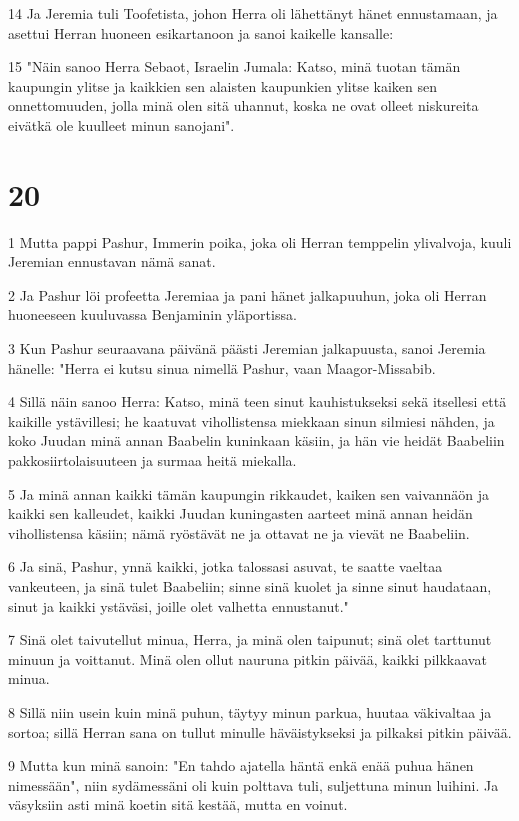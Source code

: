 \par 14 Ja Jeremia tuli Toofetista, johon Herra oli lähettänyt hänet ennustamaan, ja asettui Herran huoneen esikartanoon ja sanoi kaikelle kansalle:
\par 15 "Näin sanoo Herra Sebaot, Israelin Jumala: Katso, minä tuotan tämän kaupungin ylitse ja kaikkien sen alaisten kaupunkien ylitse kaiken sen onnettomuuden, jolla minä olen sitä uhannut, koska ne ovat olleet niskureita eivätkä ole kuulleet minun sanojani".

\chapter{20}

\par 1 Mutta pappi Pashur, Immerin poika, joka oli Herran temppelin ylivalvoja, kuuli Jeremian ennustavan nämä sanat.
\par 2 Ja Pashur löi profeetta Jeremiaa ja pani hänet jalkapuuhun, joka oli Herran huoneeseen kuuluvassa Benjaminin yläportissa.
\par 3 Kun Pashur seuraavana päivänä päästi Jeremian jalkapuusta, sanoi Jeremia hänelle: "Herra ei kutsu sinua nimellä Pashur, vaan Maagor-Missabib.
\par 4 Sillä näin sanoo Herra: Katso, minä teen sinut kauhistukseksi sekä itsellesi että kaikille ystävillesi; he kaatuvat vihollistensa miekkaan sinun silmiesi nähden, ja koko Juudan minä annan Baabelin kuninkaan käsiin, ja hän vie heidät Baabeliin pakkosiirtolaisuuteen ja surmaa heitä miekalla.
\par 5 Ja minä annan kaikki tämän kaupungin rikkaudet, kaiken sen vaivannäön ja kaikki sen kalleudet, kaikki Juudan kuningasten aarteet minä annan heidän vihollistensa käsiin; nämä ryöstävät ne ja ottavat ne ja vievät ne Baabeliin.
\par 6 Ja sinä, Pashur, ynnä kaikki, jotka talossasi asuvat, te saatte vaeltaa vankeuteen, ja sinä tulet Baabeliin; sinne sinä kuolet ja sinne sinut haudataan, sinut ja kaikki ystäväsi, joille olet valhetta ennustanut."
\par 7 Sinä olet taivutellut minua, Herra, ja minä olen taipunut; sinä olet tarttunut minuun ja voittanut. Minä olen ollut nauruna pitkin päivää, kaikki pilkkaavat minua.
\par 8 Sillä niin usein kuin minä puhun, täytyy minun parkua, huutaa väkivaltaa ja sortoa; sillä Herran sana on tullut minulle häväistykseksi ja pilkaksi pitkin päivää.
\par 9 Mutta kun minä sanoin: "En tahdo ajatella häntä enkä enää puhua hänen nimessään", niin sydämessäni oli kuin polttava tuli, suljettuna minun luihini. Ja väsyksiin asti minä koetin sitä kestää, mutta en voinut.
